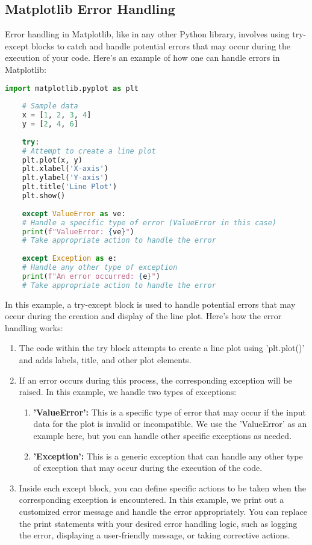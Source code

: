 \subsection{Matplotlib Error Handling}

Error handling in Matplotlib, like in any other Python library, involves using try-except blocks to catch and handle potential errors that may occur during the execution of your code. Here's an example of how one can handle errors in Matplotlib:

\begin{lstlisting}[language=Python, caption={Line Plot Example with Error Handling}, label={code:line-plot-example}, style=pythonstyle]
	import matplotlib.pyplot as plt
	
	# Sample data
	x = [1, 2, 3, 4]
	y = [2, 4, 6]
	
	try:
	# Attempt to create a line plot
	plt.plot(x, y)
	plt.xlabel('X-axis')
	plt.ylabel('Y-axis')
	plt.title('Line Plot')
	plt.show()
	
	except ValueError as ve:
	# Handle a specific type of error (ValueError in this case)
	print(f"ValueError: {ve}")
	# Take appropriate action to handle the error
	
	except Exception as e:
	# Handle any other type of exception
	print(f"An error occurred: {e}")
	# Take appropriate action to handle the error
\end{lstlisting}


In this example, a try-except block is used to handle potential errors that may occur during the creation and display of the line plot. Here's how the error handling works:

\begin{enumerate}
	\item The code within the try block attempts to create a line plot using 'plt.plot()' and adds labels, title, and other plot elements.
	
	\item If an error occurs during this process, the corresponding exception will be raised. In this example, we handle two types of exceptions:
	\begin{enumerate}
		\item \textbf{'ValueError':} This is a specific type of error that may occur if the input data for the plot is invalid or incompatible. We use the 'ValueError' as an example here, but you can handle other specific exceptions as needed.
		\item \textbf{'Exception':} This is a generic exception that can handle any other type of exception that may occur during the execution of the code.
	\end{enumerate}
	
	\item Inside each except block, you can define specific actions to be taken when the corresponding exception is encountered. In this example, we print out a customized error message and handle the error appropriately. You can replace the print statements with your desired error handling logic, such as logging the error, displaying a user-friendly message, or taking corrective actions.
	
\end{enumerate}


